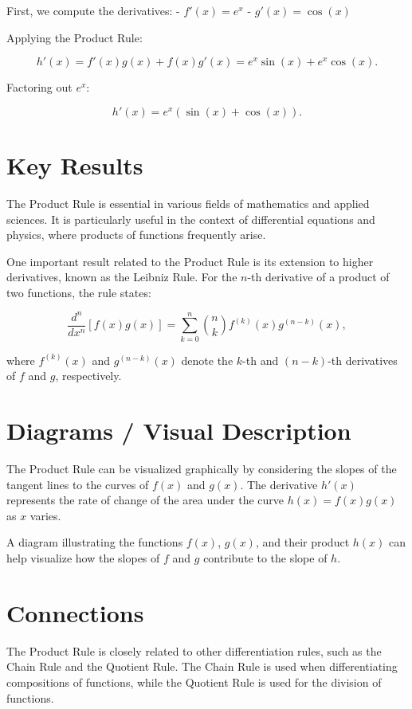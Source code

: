 \documentclass[11pt,a4paper]{article}
\begin{document}
First, we compute the derivatives:
- \( f'(x) = e^x \)
- \( g'(x) = \cos(x) \)

Applying the Product Rule:

\[
h'(x) = f'(x)g(x) + f(x)g'(x) = e^x \sin(x) + e^x \cos(x).
\]

Factoring out \( e^x \):

\[
h'(x) = e^x (\sin(x) + \cos(x)).
\]

\section{Key Results}
The Product Rule is essential in various fields of mathematics and applied sciences. It is particularly useful in the context of differential equations and physics, where products of functions frequently arise. 

One important result related to the Product Rule is its extension to higher derivatives, known as the Leibniz Rule. For the \( n \)-th derivative of a product of two functions, the rule states:

\begin{equation}
\frac{d^n}{dx^n}[f(x)g(x)] = \sum_{k=0}^{n} \binom{n}{k} f^{(k)}(x) g^{(n-k)}(x),
\end{equation}

where \( f^{(k)}(x) \) and \( g^{(n-k)}(x) \) denote the \( k \)-th and \( (n-k) \)-th derivatives of \( f \) and \( g \), respectively.

\section{Diagrams / Visual Description}
The Product Rule can be visualized graphically by considering the slopes of the tangent lines to the curves of \( f(x) \) and \( g(x) \). The derivative \( h'(x) \) represents the rate of change of the area under the curve \( h(x) = f(x)g(x) \) as \( x \) varies. 

A diagram illustrating the functions \( f(x) \), \( g(x) \), and their product \( h(x) \) can help visualize how the slopes of \( f \) and \( g \) contribute to the slope of \( h \).

\section{Connections}
The Product Rule is closely related to other differentiation rules, such as the Chain Rule and the Quotient Rule. The Chain Rule is used when differentiating compositions of functions, while the Quotient Rule is used for the division of functions. 
\end{document}
